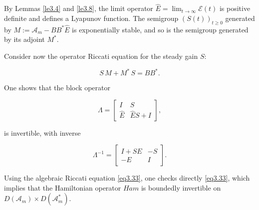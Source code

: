 \documentclass[10pt, a4]{amsart}
\makeatletter
\theoremstyle{plain}
\theoremstyle{definition}
\theoremstyle{remark}
\renewenvironment{proof}[1][\proofname]{\par
  \pushQED{\qed}%
  \normalfont \topsep6\p@\@plus6\p@\relax
  \trivlist
  \item[\hskip\labelsep
        \itshape
    #1\ \ref{#1}.]\ignorespaces
}{%
  \popQED\endtrivlist\@endpefalse
}
\numberwithin{equation}{section}
\def\to{\rightarrow}
\makeatother
\begin{document}
\begin{proof}[of Lemma \ref{le3.10}]
By Lemmas \ref{le3.4} and \ref{le3.8}, the limit operator $\hat{E} = \lim_{t\to\infty}\mathcal{E}(t)$ is positive definite and defines a Lyapunov function. The semigroup $(S(t))_{t\ge0}$ generated by $M := \mathcal{A}_m - B B^* \hat{E}$ is exponentially stable, and so is the semigroup generated by its adjoint $M^*$.

Consider now the operator Riccati equation for the steady gain $S$:

$$
S\,M + M^*\,S = B B^*.
$$

One shows that the block operator

$$
      \Lambda = \begin{bmatrix}
  I & S\\[1mm]
  \hat{E} & \hat{E}S+I
  \end{bmatrix},
$$

is invertible, with inverse

\[
\Lambda^{-1} = \begin{bmatrix}
I+SE & -S\\[1mm]
-E & I
\end{bmatrix}.
\]

Using the algebraic Riccati equation \eqref{eq3.33}, one checks directly \eqref{eq3.33}, which implies that the Hamiltonian operator
$Ham$ is boundedly invertible on $D(\mathcal{A}_m)\times D(\mathcal{A}_m^*)$.

\end{proof}
\end{document}
